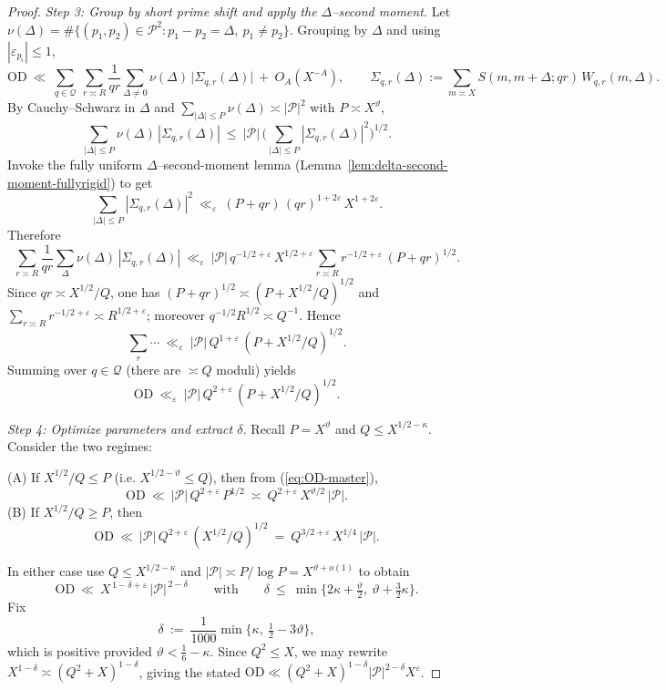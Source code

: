 \documentclass[11pt]{article}
\def\eqref#1{(\ref{#1})}%
\theoremstyle{definition}
\theoremstyle{remark}
\numberwithin{equation}{part}
\begin{document}
\begin{proof}
	\emph{Step 3: Group by short prime shift and apply the $\Delta$–second moment.}
	Let $\nu(\Delta)=\#\{(p_1,p_2)\in\mathcal P^2: p_1-p_2=\Delta,\ p_1\ne p_2\}$.
	Grouping by $\Delta$ and using $|\varepsilon_{p_i}|\le1$,
	\[
		\mathrm{OD}\ \ll\ \sum_{q\in\mathcal Q}\ \sum_{r\asymp R}\frac{1}{qr}
		\sum_{\Delta\ne 0}\nu(\Delta)\,\Big|\Sigma_{q,r}(\Delta)\Big|
		\ +\ O_A(X^{-A}),
		\qquad
		\Sigma_{q,r}(\Delta):=\sum_{m\asymp X} S(m,m+\Delta;qr)\,W_{q,r}(m,\Delta).
	\]
	By Cauchy–Schwarz in $\Delta$ and $\sum_{|\Delta|\le P}\nu(\Delta)\asymp|\mathcal P|^2$ with $P\asymp X^\vartheta$,
	\[
		\sum_{|\Delta|\le P}\nu(\Delta)\,|\Sigma_{q,r}(\Delta)|
		\ \le\ |\mathcal P|\,\Big(\sum_{|\Delta|\le P}|\Sigma_{q,r}(\Delta)|^2\Big)^{1/2}.
	\]
	Invoke the fully uniform $\Delta$–second-moment lemma (Lemma~\ref{lem:delta-second-moment-fullyrigid}) to get
	\[
		\sum_{|\Delta|\le P}|\Sigma_{q,r}(\Delta)|^2
		\ \ll_\varepsilon\ (P+qr)\,(qr)^{1+2\varepsilon}\,X^{1+2\varepsilon}.
	\]
	Therefore
	\[
		\sum_{r\asymp R}\frac{1}{qr}\sum_{\Delta}\nu(\Delta)\,|\Sigma_{q,r}(\Delta)|
		\ \ll_\varepsilon\ |\mathcal P|\,q^{-1/2+\varepsilon}\,X^{1/2+\varepsilon}
		\sum_{r\asymp R} r^{-1/2+\varepsilon}\,(P+qr)^{1/2}.
	\]
	Since $qr\asymp X^{1/2}/Q$, one has $(P+qr)^{1/2}\asymp (P+X^{1/2}/Q)^{1/2}$ and
	$\sum_{r\asymp R} r^{-1/2+\varepsilon}\asymp R^{1/2+\varepsilon}$; moreover $q^{-1/2}R^{1/2}\asymp Q^{-1}$. Hence
	\[
		\sum_{r}\cdots\ \ll_\varepsilon\ |\mathcal P|\,Q^{1+\varepsilon}\,(P+X^{1/2}/Q)^{1/2}.
	\]
	Summing over $q\in\mathcal Q$ (there are $\asymp Q$ moduli) yields
	\begin{equation}\label{eq:OD-master}
		\mathrm{OD}\ \ll_\varepsilon\ |\mathcal P|\,Q^{2+\varepsilon}\,(P+X^{1/2}/Q)^{1/2}.
	\end{equation}

	\emph{Step 4: Optimize parameters and extract $\delta$.}
	Recall $P=X^\vartheta$ and $Q\le X^{1/2-\kappa}$. Consider the two regimes:

	\smallskip
	\noindent(A) If $X^{1/2}/Q\le P$ (i.e. $X^{1/2-\vartheta}\le Q$), then from \eqref{eq:OD-master},
	\[
		\mathrm{OD}\ \ll\ |\mathcal P|\,Q^{2+\varepsilon}\,P^{1/2}
		\ \asymp\ Q^{2+\varepsilon}\,X^{\vartheta/2}\,|\mathcal P|.
	\]
	(B) If $X^{1/2}/Q\ge P$, then
	\[
		\mathrm{OD}\ \ll\ |\mathcal P|\,Q^{2+\varepsilon}\,(X^{1/2}/Q)^{1/2}
		\ =\ Q^{3/2+\varepsilon}\,X^{1/4}\,|\mathcal P|.
	\]

	In either case use $Q\le X^{1/2-\kappa}$ and $|\mathcal P|\asymp P/\log P=X^{\vartheta+o(1)}$ to obtain
	\[
		\mathrm{OD}\ \ll\ X^{\,1-\delta+\varepsilon}\,|\mathcal P|^{\,2-\delta}
		\qquad\text{with}\qquad
		\delta\ \le\ \min\Big\{2\kappa+\tfrac{\vartheta}{2},\ \vartheta+\tfrac{3}{2}\kappa\Big\}.
	\]
	Fix
	\[
		\delta\ :=\ \frac{1}{1000}\min\Big\{\kappa,\ \tfrac12-3\vartheta\Big\},
	\]
	which is positive provided $\vartheta<\tfrac16-\kappa$. Since $Q^2\le X$, we may rewrite $X^{1-\delta}\asymp (Q^2+X)^{1-\delta}$, giving the stated $\mathrm{OD}\ll (Q^2+X)^{1-\delta}|\mathcal P|^{2-\delta}X^\varepsilon$.


\end{proof}
\end{document}
